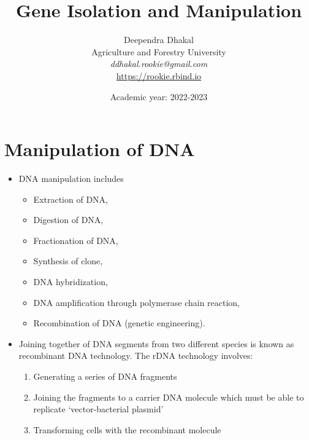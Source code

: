 \documentclass[11pt,dvipsnames,ignorenonframetext,aspectratio=169]{beamer}
\title[]{Gene Isolation and Manipulation}
\author[
        Deependra Dhakal\\
Agriculture and Forestry University\\
\textit{ddhakal.rookie@gmail.com}\\
\url{https://rookie.rbind.io}
    ]{Deependra Dhakal\\
Agriculture and Forestry University\\
\textit{ddhakal.rookie@gmail.com}\\
\url{https://rookie.rbind.io}}
\date[
      Academic year: 2022-2023
  ]{
      Academic year: 2022-2023
        }
\providecommand{\tightlist}{%
  \setlength{\itemsep}{0pt}\setlength{\parskip}{0pt}}
\begin{document}
  \begin{frame}[plain]
  \titlepage
  \end{frame}



\hypertarget{manipulation-of-dna}{%
\section{Manipulation of DNA}\label{manipulation-of-dna}}

\begin{frame}{}
\protect\hypertarget{section}{}
\begin{itemize}
\tightlist
\item
  DNA manipulation includes

  \begin{itemize}
  \tightlist
  \item
    Extraction of DNA,
  \item
    Digestion of DNA,
  \item
    Fractionation of DNA,
  \item
    Synthesis of clone,
  \item
    DNA hybridization,
  \item
    DNA amplification through polymerase chain reaction,
  \item
    Recombination of DNA (genetic engineering).
  \end{itemize}
\end{itemize}
\end{frame}

\begin{frame}{}
\protect\hypertarget{section-1}{}
\begin{itemize}
\tightlist
\item
  Joining together of DNA segments from two different species is known
  as recombinant DNA technology. The rDNA technology involves:

  \begin{enumerate}
  \tightlist
  \item
    Generating a series of DNA fragments
  \item
    Joining the fragments to a carrier DNA molecule which must be able
    to replicate `vector-bacterial plasmid'
  \item
    Transforming cells with the recombinant molecule
  \end{enumerate}
\end{itemize}
\end{frame}
\end{document}
